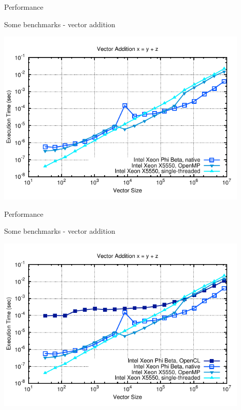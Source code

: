 \begin{frame}{Performance}
\begin{block}{Some benchmarks - vector addition}
  \begin{center}
   \includegraphics[width=0.9\textwidth]{figs/vector-timings-3}
  \end{center}
\end{block}
\end{frame}

\begin{frame}{Performance}
\begin{block}{Some benchmarks - vector addition}
  \begin{center}
   \includegraphics[width=0.9\textwidth]{figs/vector-timings-4}
  \end{center}
\end{block}
\end{frame}

